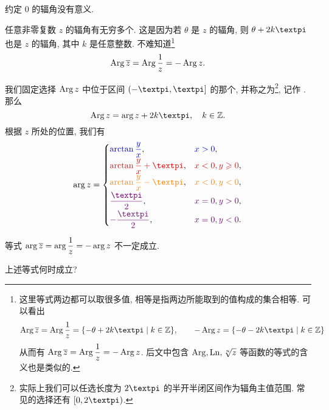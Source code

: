 \begin{marker}
  约定 $0$ 的辐角没有意义.
\end{marker}

任意非零复数 $z$ 的辐角有无穷多个.
这是因为若 $\theta$ 是 $z$ 的辐角, 则 $\theta+2k\cpi$ 也是 $z$ 的辐角, 其中 $k$ 是任意整数.
不难知道\footnote{%
这里等式两边都可以取很多值, 相等是指两边所能取到的值构成的集合相等.
可以看出
\[
  \Arg\ov z=\Arg\frac1z=\{-\theta+2k\cpi\mid k\in\BZ\},\qquad
  -\Arg z=\{-\theta-2k\cpi\mid k\in\BZ\}
\]
从而有 $\operatorname{Arg} \overline z=\operatorname{Arg}\dfrac1z=-\operatorname{Arg} z$.
后文中包含 $\operatorname{Arg},\operatorname{Ln},\sqrt[n]{z}$ 等函数的等式的含义也是类似的.
}
\[
  \operatorname{Arg} \overline z=\operatorname{Arg}\dfrac1z=-\operatorname{Arg} z.
\]

我们固定选择 $\operatorname{Arg} z$ 中位于区间 $(-\cpi,\cpi]$ 的那个, 并称之为\footnote{%
  实际上我们可以任选长度为 $2\cpi$ 的半开半闭区间作为辐角主值范围. 常见的选择还有 $[0,2\cpi)$.
}, 记作 .
那么
\[
  \Arg z=\arg z+2k\cpi, \quad k\in\BZ.
\]
根据 $z$ 所处的位置, 我们有
\begin{equation}
  \label{eq:arg}
  \arg z=\begin{cases}
    {\color{main}\arctan\dfrac yx},&
      {\color{main}x>0},\\[4pt]
    {\color{second}\arctan\dfrac yx+\cpi},&
      {\color{second}x<0,y\ge0},\\[4pt]
    {\color{fifth}\arctan\dfrac yx-\cpi},&
      {\color{fifth}x<0,y<0},\\[4pt]
    {\color{third}\dfrac\cpi2},&
      {\color{third}x=0,y>0},\\[4pt]
    {\color{third}-\dfrac\cpi2},&
      {\color{third}x=0,y<0}.
  \end{cases}
\end{equation}

\begin{marker}
  等式 $\arg\overline z=\arg\dfrac1z=-\arg z$ 不一定成立.
\end{marker}

\begin{exercise}
  上述等式何时成立?  
\end{exercise}

